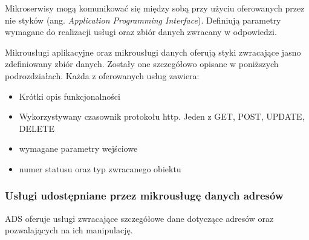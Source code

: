 Mikroserwisy mogą komunikować się między sobą przy użyciu oferowanych przez nie 
styków (ang. \textit{Application Programming Interface}). Definiują parametry wymagane 
do realizacji usługi oraz zbiór danych zwracany w odpowiedzi.

Mikrousługi aplikacyjne oraz mikrousługi danych oferują styki zwracające jasno 
zdefiniowany zbiór danych. Zostały one szczegółowo opisane w poniższych podrozdziałach. 
Każda z oferowanych usług zawiera:

\begin{itemize} %
    \item Krótki opis funkcjonalności
    \item Wykorzystywany czasownik protokołu http. Jeden z GET, POST, UPDATE, DELETE
    \item wymagane parametry wejściowe
    \item numer statusu oraz typ zwracanego obiektu
\end{itemize}

\subsubsection{Usługi udostępniane przez mikrousługę danych adresów}

ADS oferuje usługi zwracające szczegółowe dane dotyczące adresów oraz pozwalających
na ich manipulację.


